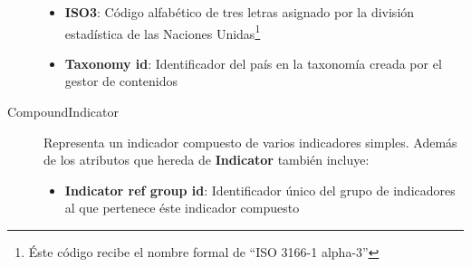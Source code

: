 \begin{description}
\begin{itemize}
		\item \textbf{ISO3}:  Código alfabético de tres letras asignado por la división estadística de las Naciones Unidas\footnote{Éste código recibe el nombre formal de ``ISO 3166-1 alpha-3''}
		\item \textbf{Taxonomy id}:  Identificador del país en la taxonomía creada por el gestor de contenidos
	\end{itemize}
	\item[CompoundIndicator]  Representa un indicador compuesto de varios indicadores simples.  Además de los atributos que hereda de \textbf{Indicator} también incluye:
		\begin{itemize}
			\item \textbf{Indicator ref group id}:  Identificador único del grupo de indicadores al que pertenece éste indicador compuesto
		\end{itemize}
\end{description}

